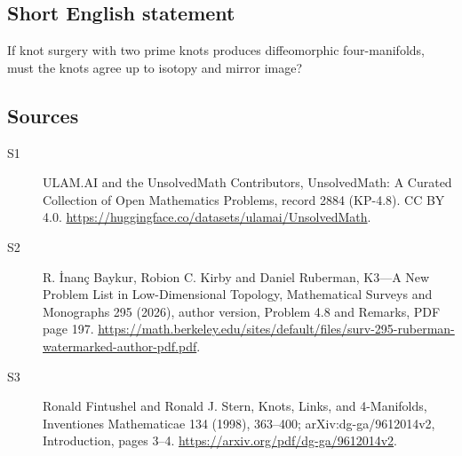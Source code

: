 \documentclass[11pt]{article}
\begin{document}
\subsection{Short English statement}
If knot surgery with two prime knots produces diffeomorphic four-manifolds, must the knots agree up to isotopy and mirror image?
\subsection{Sources}
\begin{description}
\item[\hypertarget{source:2884:1}{S1}] ULAM.AI and the UnsolvedMath Contributors, UnsolvedMath: A Curated Collection of Open Mathematics Problems, record 2884 (KP-4.8). CC BY 4.0. \url{https://huggingface.co/datasets/ulamai/UnsolvedMath}.
\item[\hypertarget{source:2884:2}{S2}] R. İnanç Baykur, Robion C. Kirby and Daniel Ruberman, K3—A New Problem List in Low-Dimensional Topology, Mathematical Surveys and Monographs 295 (2026), author version, Problem 4.8 and Remarks, PDF page 197. \url{https://math.berkeley.edu/sites/default/files/surv-295-ruberman-watermarked-author-pdf.pdf}.
\item[\hypertarget{source:2884:3}{S3}] Ronald Fintushel and Ronald J. Stern, Knots, Links, and 4-Manifolds, Inventiones Mathematicae 134 (1998), 363--400; arXiv:dg-ga/9612014v2, Introduction, pages 3--4. \url{https://arxiv.org/pdf/dg-ga/9612014v2}.
\end{description}
\label{end:2884}
\end{document}
